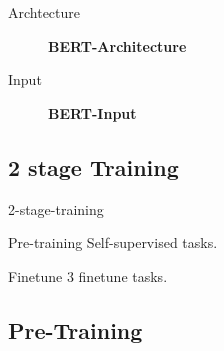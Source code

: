 \documentclass[10pt]{beamer}
\begin{document}
  \begin{frame}{Archtecture}
    \begin{figure}
      \centering
      \caption{\textbf{BERT-Architecture} }
    \end{figure}
  \end{frame}

  \begin{frame}{Input}
    \begin{figure}
      \centering
      \caption{\textbf{BERT-Input} }
    \end{figure}
  \end{frame}

  \subsection{2 stage Training}

  \begin{frame}{2-stage-training}

    \begin{exampleblock}{Pre-training}
      Self-supervised tasks.
    \end{exampleblock}

      \begin{exampleblock}{Finetune}
        3 finetune tasks.
      \end{exampleblock}

  \end{frame}

  \subsection{Pre-Training}
\end{document}
